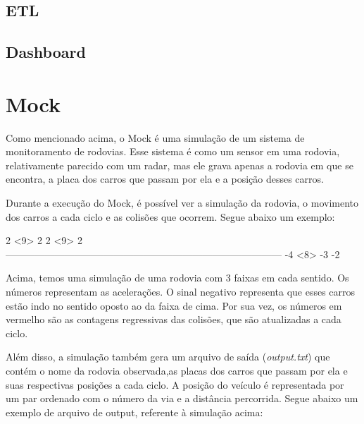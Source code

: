 \documentclass{article}
\def\openesc{\color{red}}
\def\closeesc{\color{black}}
\def\vbdelim{\catcode`<=\active\catcode`>=\active%
\def<{\openesc}
\def>{\closeesc}}
\begin{document}
    \subsection*{ETL}
    \lipsum[1]

    \subsection*{Dashboard}
    \lipsum[2]

    \section{Mock}
    Como mencionado acima, o Mock é uma simulação de um sistema de monitoramento de rodovias.
    Esse sistema é como um sensor em uma rodovia, relativamente parecido com um radar, mas ele
    grava apenas a rodovia em que se encontra, a placa dos carros que passam por ela e a posição
    desses carros.

    Durante a execução do Mock, é possível ver a simulação da rodovia, o movimento dos carros a cada
    ciclo e as colisões que ocorrem. Segue abaixo um exemplo:

    \begin{verbnobox}[\vbdelim]
2                                                     <9>                                                                                                           2                                                                                                                                        
 2                                                        <9>                 
                               2                                            
------------------------------------------------------------------------------------
                                                 -4                         
                                                 <8>                        -3         
             -2
    \end{verbnobox}
    
    Acima, temos uma simulação de uma rodovia com 3 faixas em cada sentido. Os números representam
    as acelerações. O sinal negativo representa que esses carros estão indo no sentido oposto ao
    da faixa de cima. Por sua vez, os números em vermelho são as contagens regressivas das colisões,
    que são atualizadas a cada ciclo.

    Além disso, a simulação também gera um arquivo de saída (\textit{output.txt}) que contém o nome
    da rodovia observada,as placas dos carros que passam por ela e suas respectivas posições a cada
    ciclo. A posição do veículo é representada por um par ordenado com o número da via e a distância
    percorrida. Segue abaixo um exemplo de arquivo de output, referente à simulação acima:
\end{document}
